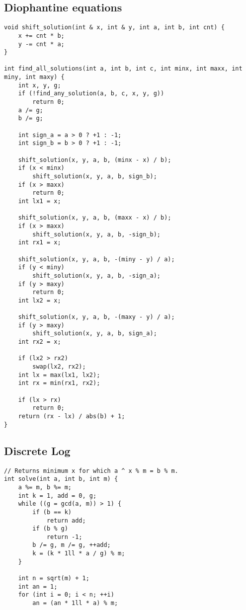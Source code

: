\documentclass[10pt]{article}
\begin{document}
\begin{multicols*}{2}
\subsection{Diophantine equations}

\begin{lstlisting}[style=compactcpp]
void shift_solution(int & x, int & y, int a, int b, int cnt) {
    x += cnt * b;
    y -= cnt * a;
}

int find_all_solutions(int a, int b, int c, int minx, int maxx, int miny, int maxy) {
    int x, y, g;
    if (!find_any_solution(a, b, c, x, y, g))
        return 0;
    a /= g;
    b /= g;

    int sign_a = a > 0 ? +1 : -1;
    int sign_b = b > 0 ? +1 : -1;

    shift_solution(x, y, a, b, (minx - x) / b);
    if (x < minx)
        shift_solution(x, y, a, b, sign_b);
    if (x > maxx)
        return 0;
    int lx1 = x;

    shift_solution(x, y, a, b, (maxx - x) / b);
    if (x > maxx)
        shift_solution(x, y, a, b, -sign_b);
    int rx1 = x;

    shift_solution(x, y, a, b, -(miny - y) / a);
    if (y < miny)
        shift_solution(x, y, a, b, -sign_a);
    if (y > maxy)
        return 0;
    int lx2 = x;

    shift_solution(x, y, a, b, -(maxy - y) / a);
    if (y > maxy)
        shift_solution(x, y, a, b, sign_a);
    int rx2 = x;

    if (lx2 > rx2)
        swap(lx2, rx2);
    int lx = max(lx1, lx2);
    int rx = min(rx1, rx2);

    if (lx > rx)
        return 0;
    return (rx - lx) / abs(b) + 1;
}
\end{lstlisting}

\subsection{Discrete Log}

\begin{lstlisting}[style=compactcpp]
// Returns minimum x for which a ^ x % m = b % m.
int solve(int a, int b, int m) {
    a %= m, b %= m;
    int k = 1, add = 0, g;
    while ((g = gcd(a, m)) > 1) {
        if (b == k)
            return add;
        if (b % g)
            return -1;
        b /= g, m /= g, ++add;
        k = (k * 1ll * a / g) % m;
    }

    int n = sqrt(m) + 1;
    int an = 1;
    for (int i = 0; i < n; ++i)
        an = (an * 1ll * a) % m;


\end{lstlisting}
\end{multicols*}
\end{document}
